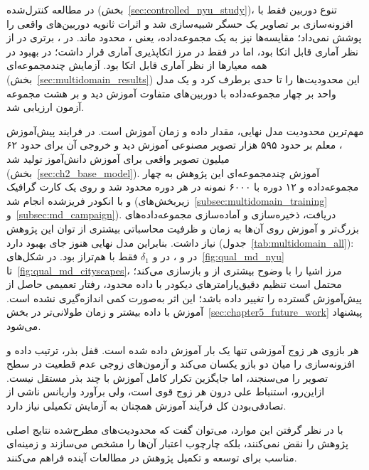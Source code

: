 در مطالعه کنترل‌شده (بخش~\ref{sec:controlled_nyu_study})، تنوع دوربین فقط با افزونه‌سازی بر تصاویر یک حسگر شبیه‌سازی شد و اثرات ثانویه دوربین‌های واقعی را پوشش نمی‌داد؛ مقایسه‌ها نیز به یک مجموعه‌داده، یعنی ، محدود ماند. در \zoomcropconfig{}، برتری \proposedmodel{} در  از نظر آماری قابل اتکا بود، اما در  فقط در مرز اتکاپذیری آماری قرار داشت؛ در \focaljitterconfig{} بهبود در همه معیارها از نظر آماری قابل اتکا بود. آزمایش چندمجموعه‌ای (بخش~\ref{sec:multidomain_results}) این محدودیت‌ها را تا حدی برطرف کرد و یک مدل واحد بر چهار مجموعه‌داده با دوربین‌های متفاوت آموزش دید و بر هشت مجموعه آزمون ارزیابی شد.

مهم‌ترین محدودیت مدل نهایی، مقدار داده و زمان آموزش است. در فرایند پیش‌آموزش \basemodel{}، معلم بر حدود ۵۹۵ هزار تصویر مصنوعی آموزش دید و خروجی آن برای حدود ۶۲ میلیون تصویر واقعی برای آموزش دانش‌آموز تولید شد (بخش~\ref{sec:ch2_base_model}). آموزش چندمجموعه‌ای این پژوهش به چهار مجموعه‌داده و ۱۲ دوره با ۶۰۰۰ نمونه در هر دوره محدود شد و روی یک کارت گرافیک  و با انکودر فریزشده  انجام شد (زیربخش‌های~\ref{subsec:multidomain_training} و~\ref{subsec:md_campaign}). دریافت، ذخیره‌سازی و آماده‌سازی مجموعه‌داده‌های بزرگ‌تر و آموزش روی آن‌ها به زمان و ظرفیت محاسباتی بیشتری از توان این پژوهش نیاز داشت. بنابراین مدل نهایی هنوز جای بهبود دارد (جدول~\ref{tab:multidomain_all}): در  و ، \proposedmodel{} در  و $\delta_1$ فقط با \publishedbasemodel{} هم‌تراز بود. در شکل‌های~\ref{fig:qual_md_nyu} تا~\ref{fig:qual_md_cityscapes}، \publishedbasemodel{} مرز اشیا را با وضوح بیشتری از \proposedmodel{} و \controlmodel{} بازسازی می‌کند؛ محتمل است تنظیم دقیق‌پارامترهای دیکودر با داده محدود، رفتار تعمیمی حاصل از پیش‌آموزش گسترده \basemodel{} را تغییر داده باشد؛ این اثر به‌صورت کمی اندازه‌گیری نشده است. آموزش با داده بیشتر و زمان طولانی‌تر در بخش~\ref{sec:chapter5_future_work} پیشنهاد می‌شود.


هر بازوی هر زوج آموزشی تنها یک بار آموزش داده شده است. قفل بذر، ترتیب داده و افزونه‌سازی را میان دو بازو یکسان می‌کند و آزمون‌های زوجی عدم قطعیت در سطح تصویر را می‌سنجند، اما جایگزین تکرار کامل آموزش با چند بذر مستقل نیست. ازاین‌رو، استنباط علی درون هر زوج قوی است، ولی برآورد واریانس ناشی از تصادفی‌بودن کل فرآیند آموزش همچنان به آزمایش تکمیلی نیاز دارد.

با در نظر گرفتن این موارد،
می‌توان گفت که محدودیت‌های مطرح‌شده
نتایج اصلی پژوهش را نقض نمی‌کنند،
بلکه چارچوب اعتبار آن‌ها را مشخص می‌سازند
و زمینه‌ای مناسب
برای توسعه و تکمیل پژوهش
در مطالعات آینده فراهم می‌کنند.


